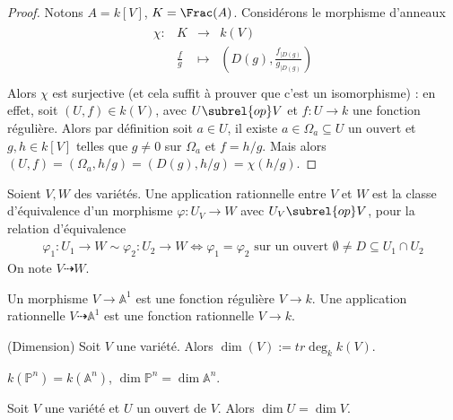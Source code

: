         \begin{proof}
            Notons $A = k[V]$, $K = \Frac (A)$. Considérons le morphisme d'anneaux
            \begin{align*}
                \begin{array}{cccc}
                    \chi : & K & \to & k(V) \\
                    & \frac fg & \mapsto & (D(g), \frac{f_{|D(g)}}{g_{|D(g)}}) \\
                \end{array}
            \end{align*}
            Alors $\chi$ est surjective (et cela suffit à prouver que c'est un isomorphisme) : en effet, soit $(U,f) \in k(V)$, avec $U \subrel{op} V$ et $f : U \to k$ une fonction régulière. Alors par définition soit $a \in U$, il existe $a \in \Omega_a \subseteq U$ un ouvert et $g,h \in k[V]$ telles que $g \neq 0$ sur $\Omega_a$ et $f = h/g$. Mais alors $(U,f) = (\Omega_a, h/g) = (D(g), h/g) = \chi(h/g)$.
        \end{proof}
        \begin{defi}
            Soient $V,W$ des variétés. Une application rationnelle entre $V$ et $W$ est la classe d'équivalence d'un morphisme $\varphi : U_V \to W$ avec $U_V \subrel{op} V$, pour la relation d'équivalence 
            \begin{align*}
                \varphi_1 : U_1 \to W \sim \varphi_2 : U_2 \to W \iff \varphi_1 = \varphi_2 \text{ sur un ouvert } \emptyset \neq D \subseteq U_1 \cap U_2
            \end{align*}
            On note $V \dashrightarrow W$.
        \end{defi}
        \begin{remq}
            Un morphisme $V \to \mathbb{A}^1$ est une fonction régulière $V \to k$. Une application rationnelle $V \dashrightarrow \mathbb{A}^1$ est une fonction rationnelle $V \to k$.
        \end{remq}
        \begin{defi} (Dimension)
            Soit $V$ une variété. Alors $\dim(V) := tr\deg_k k(V)$.
        \end{defi}
        \begin{expl}
            $k(\mathbb{P}^n) = k(\mathbb{A}^n)$, $\dim \mathbb{P}^n = \dim \mathbb{A}^n$.
        \end{expl}
        \begin{remq}
            Soit $V$ une variété et $U$ un ouvert de $V$. Alors $\dim U = \dim V$.
        \end{remq}
